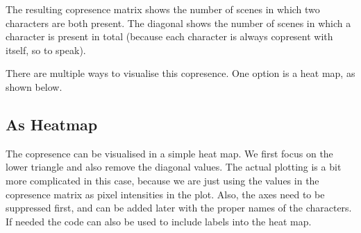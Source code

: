 \documentclass[]{book}
\begin{document}
The resulting copresence matrix shows the number of scenes in which two characters are both present. The diagonal shows the number of scenes in which a character is present in total (because each character is always copresent with itself, so to speak).

There are multiple ways to visualise this copresence. One option is a heat map, as shown below.

\hypertarget{as-heatmap}{%
\subsection{As Heatmap}\label{as-heatmap}}

The copresence can be visualised in a simple heat map. We first focus on the lower triangle and also remove the diagonal values. The actual plotting is a bit more complicated in this case, because we are just using the values in the copresence matrix as pixel intensities in the plot. Also, the axes need to be suppressed first, and can be added later with the proper names of the characters. If needed the code can also be used to include labels into the heat map.
\end{document}
